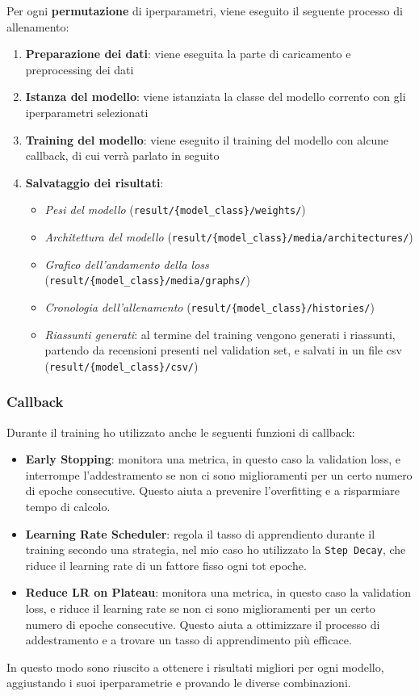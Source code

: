 Per ogni \textbf{permutazione} di iperparametri, viene eseguito il seguente processo di allenamento:
\begin{enumerate}
    \item \textbf{Preparazione dei dati}: viene eseguita la parte di caricamento e preprocessing dei dati
    \item \textbf{Istanza del modello}: viene istanziata la classe del modello corrento con gli iperparametri selezionati
    \item \textbf{Training del modello}: viene eseguito il training del modello con alcune callback, di cui verrà parlato in seguito
    \item \textbf{Salvataggio dei risultati}:
          \begin{itemize}
              \item \textit{Pesi del modello} (\texttt{result/\{model\_class\}/weights/})
              \item \textit{Architettura del modello} (\texttt{result/\{model\_class\}/media/architectures/})
              \item \textit{Grafico dell'andamento della loss} (\texttt{result/\{model\_class\}/media/graphs/})
              \item \textit{Cronologia dell'allenamento} (\texttt{result/\{model\_class\}/histories/})
              \item \textit{Riassunti generati}: al termine del training vengono generati i riassunti, partendo da recensioni presenti nel validation set, e salvati in un file csv (\texttt{result/\{model\_class\}/csv/})
          \end{itemize}
\end{enumerate}

\subsubsection{Callback}
Durante il training ho utilizzato anche le seguenti funzioni di callback:
\begin{itemize}
    \item \textbf{Early Stopping}: monitora una metrica, in questo caso la validation loss, e interrompe l'addestramento se non ci sono miglioramenti per un certo numero di epoche consecutive. Questo aiuta a prevenire l'overfitting e a risparmiare tempo di calcolo.
    \item \textbf{Learning Rate Scheduler}: regola il tasso di apprendiento durante il training secondo una strategia, nel mio caso ho utilizzato la \texttt{Step Decay}, che riduce il learning rate di un fattore fisso ogni tot epoche.
    \item \textbf{Reduce LR on Plateau}: monitora una metrica, in questo caso la validation loss, e riduce il learning rate se non ci sono miglioramenti per un certo numero di epoche consecutive. Questo aiuta a ottimizzare il processo di addestramento e a trovare un tasso di apprendimento più efficace.
\end{itemize}
In questo modo sono riuscito a ottenere i risultati migliori per ogni modello, aggiustando i suoi iperparametrie e provando le diverse combinazioni.

